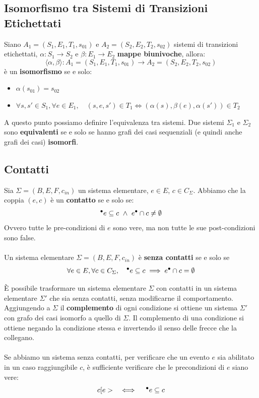 \subsection{Isomorfismo tra Sistemi di Transizioni Etichettati}
Siano $A_1 = (S_1, E_1, T_1, s_{01})$ e $A_2 = (S_2, E_2, T_2, s_{02})$ sistemi di transizioni etichettati,
$\alpha : S_1 \to S_2$ e $\beta : E_1 \to E_2$ \textbf{mappe biunivoche}, allora:
\[
   \langle \alpha, \beta \rangle : A_1 = (S_1, E_1, T_1, s_{01}) \to A_2 = (S_2, E_2, T_2, s_{02})
\]
\noindent
è un \textbf{isomorfismo} se e solo:
\begin{itemize}
    \item $\alpha (s_{01}) = s_{02}$
    \item $\forall s, s' \in S_1, \forall e \in E_1, \quad (s, e, s') \in T_1 \iff (\alpha(s), \beta(e), \alpha(s')) \in T_2$
\end{itemize}

\noindent
A questo punto possiamo definire l'equivalenza tra sistemi. Due sistemi $\Sigma_1$ e $\Sigma_2$ sono \textbf{equivalenti} se e solo se hanno grafi dei casi sequenziali (e quindi anche grafi dei casi) \textbf{isomorfi}.

\subsection{Contatti}

Sia $\Sigma = (B, E, F, c_{in})$ un sistema elementare, $e \in E$, $c \in C_\Sigma$. Abbiamo che la coppia $(e, c)$ è un \textbf{contatto} se e solo se:
\[
    \prescript{\bullet}{}{e} \subseteq c \ \wedge \ e^\bullet \cap c \neq \emptyset
\]
\noindent
Ovvero tutte le pre-condizioni di $e$ sono vere, ma non tutte le sue post-condizioni sono false.
\\
\\
Un sistema elementare $\Sigma = (B, E, F, c_{in})$ è \textbf{senza contatti} se e solo se
\[
    \forall e \in E, \forall c \in C_\Sigma, 
    \quad 
    \prescript{\bullet}{}{e} \subseteq c \implies e^\bullet \cap c = \emptyset
\]

\noindent
È possibile trasformare un sistema elementare $\Sigma$ con contatti in un sistema elementare $\Sigma'$ che sia senza contatti, senza modificarne il comportamento. Aggiungendo a $\Sigma$ il \textbf{complemento} di ogni condizione si ottiene un sistema $\Sigma'$ con grafo dei casi isomorfo a quello di $\Sigma$. Il complemento di una condizione si ottiene negando la condizione stessa e invertendo il senso delle frecce che la collegano.
\\
\\
Se abbiamo un sistema senza contatti, per verificare che un evento $e$ sia abilitato in un caso raggiungibile $c$, è sufficiente verificare che le precondizioni di $e$ siano vere:
\[
    c[e> \quad \iff \quad \prescript{\bullet}{}{e} \subseteq c
\]
